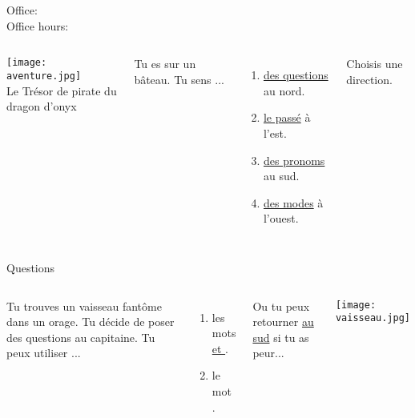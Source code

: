 \documentclass{beamer}
\subtitle[Révision, examen 1]{Révision pour l'examen 1}
\begin{document}
  \begin{frame}
    \titlepage
    \tiny{Office: \\
          Office hours: }
  \end{frame}

  \begin{frame}{}
    \hypertarget{début}{}
    \begin{columns}
        \begin{center}
          \texttt{[image: aventure.jpg]} \\
          Le Trésor de pirate du dragon d'onyx
        \end{center}
        Tu es sur un bâteau.
        Tu sens ...
        \begin{enumerate}
          \item \hyperlink{questions}{des questions} au nord.
          \item \hyperlink{passé}{le passé} à l'est.
          \item \hyperlink{pronoms}{des pronoms} au sud.
          \item \hyperlink{modes}{des modes} à l'ouest.
        \end{enumerate}
        Choisis une direction.
    \end{columns}
  \end{frame}

  \begin{frame}{Questions}
    \hypertarget{questions}{}
    \begin{columns}
        Tu trouves un vaisseau fantôme dans un orage.
        Tu décide de poser des questions au capitaine.
        Tu peux utiliser ...
        \begin{enumerate}
          \item les mots \hyperlink{que}{ et }.
          \item le mot \hyperlink{quel}{}.
        \end{enumerate}
        Ou tu peux retourner \hyperlink{début}{au sud} si tu as peur...
        \begin{center}
          \texttt{[image: vaisseau.jpg]}
        \end{center}
    \end{columns}
  \end{frame}
\end{document}

